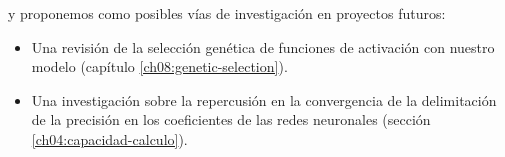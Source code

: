 y proponemos como posibles vías de investigación en proyectos futuros: 

\begin{itemize}
    \item Una revisión de la selección genética de funciones de activación con nuestro modelo (capítulo \ref{ch08:genetic-selection}).
    \item Una investigación sobre la repercusión en la convergencia de la delimitación de la precisión en los coeficientes de las redes neuronales (sección \ref{ch04:capacidad-calculo}). 
\end{itemize}


